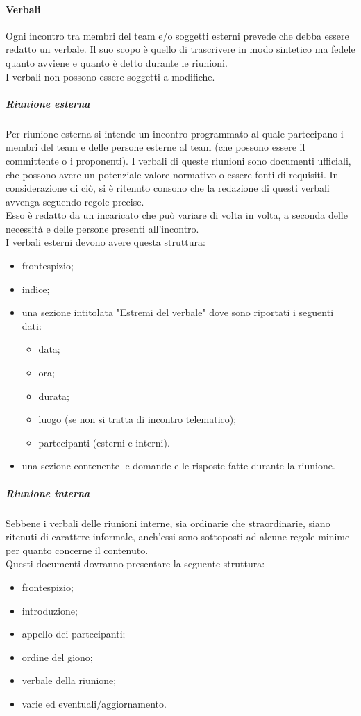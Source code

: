 			\paragraph{Verbali}
				Ogni incontro tra membri del team e/o soggetti esterni prevede che debba essere redatto un verbale. Il suo scopo è quello di trascrivere in modo sintetico ma fedele quanto avviene e quanto è detto durante le riunioni.\\
				I verbali non possono essere soggetti a modifiche.
				\subparagraph{Riunione esterna}
					Per riunione esterna si intende un incontro programmato al quale partecipano i membri del team e delle persone esterne al team (che possono essere il committente o i proponenti). I verbali di queste riunioni sono documenti ufficiali, che possono avere un potenziale valore normativo o essere fonti di requisiti. In considerazione di ciò, si è ritenuto consono che la redazione di questi verbali avvenga seguendo regole precise.\\
					Esso è redatto da un incaricato che può variare di volta in volta, a seconda delle necessità e delle persone presenti all’incontro.\\
					I verbali esterni devono avere questa struttura:
					\begin{itemize}
						\item frontespizio;
						\item indice;
						\item una sezione intitolata "Estremi del verbale" dove sono riportati i seguenti dati:
						\begin{itemize}
							\item data;
							\item ora;
							\item durata;
							\item luogo (se non si tratta di incontro telematico);
							\item partecipanti (esterni e interni).
						\end{itemize}
						\item una sezione contenente le domande e le risposte fatte durante la riunione.
					\end{itemize}
				\subparagraph{Riunione interna}
					Sebbene i verbali delle riunioni interne, sia ordinarie che straordinarie, siano ritenuti di carattere informale, anch'essi sono sottoposti ad alcune regole minime per quanto concerne il contenuto.  \\
					Questi documenti dovranno presentare la seguente struttura:
					\begin{itemize}
						\item frontespizio;
						\item introduzione;
						\item appello dei partecipanti;
						\item ordine del giono;
						\item verbale della riunione;
						\item varie ed eventuali/aggiornamento.
					\end{itemize}
